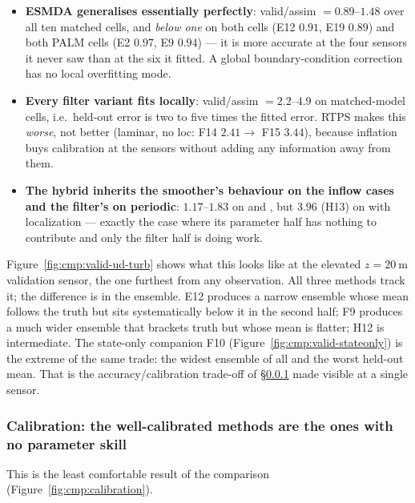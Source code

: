 \begin{itemize}[nosep]
  \item \textbf{ESMDA generalises essentially perfectly}: valid/assim
        $= 0.89$--$1.48$ over all ten matched cells, and \emph{below one} on
        both  cells (E12 $0.91$, E19 $0.89$) and both PALM
         cells (E2 $0.97$, E9 $0.94$) --- it is more
        accurate at
        the four sensors it never saw than at the six it fitted. A global
        boundary-condition correction has no local overfitting mode.
  \item \textbf{Every filter variant fits locally}: valid/assim
        $= 2.2$--$4.9$ on matched-model cells, i.e.\ held-out error is two to
        five times the fitted error. RTPS makes this \emph{worse}, not better
        (laminar, no loc: F14 $2.41 \rightarrow$ F15 $3.44$), because inflation
        buys
        calibration at the sensors without adding any information away from
        them.
  \item \textbf{The hybrid inherits the smoother's behaviour on the inflow
        cases and the filter's on periodic}: $1.17$--$1.83$ on 
        and , but $3.96$ (H13) on  with
        localization --- exactly the case where its parameter half has nothing
        to contribute and only the filter half is doing work.
\end{itemize}

Figure~\ref{fig:cmp:valid-ud-turb} shows what this looks like at the elevated
$z = \SI{20}{\meter}$ validation sensor, the one furthest from any
observation. All three methods track it; the difference is in the ensemble.
E12 produces a narrow ensemble whose mean follows the truth but sits
systematically below it in the second half; F9 produces a much wider ensemble
that brackets truth but whose mean is flatter; H12 is intermediate. The
state-only companion F10 (Figure~\ref{fig:cmp:valid-stateonly}) is the extreme
of the same trade: the widest ensemble of all and the worst held-out mean. That is the accuracy/calibration trade-off of
\S\ref{sec:cmp:calibration} made visible at a single sensor.

\subsubsection{Calibration: the well-calibrated methods are the ones with no
parameter skill}
\label{sec:cmp:calibration}

This is the least comfortable result of the comparison
(Figure~\ref{fig:cmp:calibration}).


